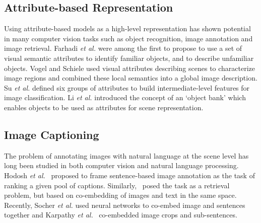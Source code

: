 \documentclass[10pt,journal,compsoc]{IEEEtran}
\newcommand{\etal}{\emph{et al.}}
\begin{document}
\subsection{Attribute-based Representation} Using attribute-based models as a high-level representation has shown potential in many computer vision tasks such as object recognition, image annotation and image retrieval. Farhadi \etal \cite{farhadi2009describing} were
among the first to propose to use a set of visual semantic attributes to identify familiar objects, and to describe unfamiliar objects. Vogel and Schiele \cite{vogel2007semantic} used visual attributes describing scenes to characterize image regions and combined these local semantics into a global image description. Su \etal \cite{su2012improving} defined six groups of attributes to build intermediate-level features for image classification. Li \etal \cite{li2010object,li2012objects} introduced the concept of an `object bank' which enables objects to be used as attributes for scene representation.

\subsection{Image Captioning} The problem of annotating images with natural language at the scene level has long been studied in both computer vision and natural language processing. Hodosh \etal~\cite{hodosh2013framing} proposed to frame sentence-based image annotation as the task of ranking a given pool of captions. Similarly,~\cite{gong2014improving,jia2011learning,ordonez2011im2text} posed the task as a retrieval problem, but based on co-embedding of images and text in the same space. Recently, Socher \etal \cite{socher2014grounded} used neural networks to co-embed image and sentences together and Karpathy \etal~\cite{karpathy2014deep} co-embedded image crops and sub-sentences. 
\end{document}

